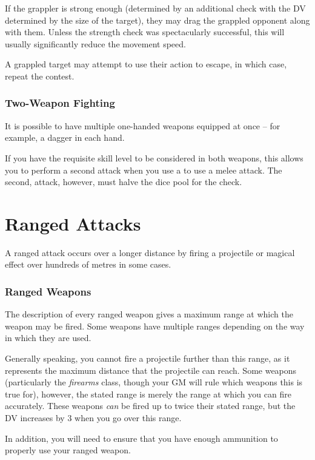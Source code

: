 If the grappler is strong enough (determined by an additional  check with the DV determined by the size of the target), they may drag the grappled opponent along with them. Unless the strength check was spectacularly successful, this will usually significantly reduce the movement speed. 

A grappled target may attempt to use their action to escape, in which case, repeat the contest. 

\subsubsection{Two-Weapon Fighting}

It is possible to have multiple one-handed weapons equipped at once -- for example, a dagger in each hand. 

If you have the requisite skill level to be considered  in both weapons, this allows you to perform a second attack when you use a  to use a melee attack. The second, attack, however, must halve the dice pool for the check.


\section{Ranged Attacks}

A ranged attack occurs over a longer distance by firing a projectile or magical effect over hundreds of metres in some cases. 

\subsubsection{Ranged Weapons}

The description of every ranged weapon gives a maximum range at which the weapon may be fired. Some weapons have multiple ranges depending on the way in which they are used. 

Generally speaking, you cannot fire a projectile further than this range, as it represents the maximum distance that the projectile can reach. Some weapons (particularly the {\it firearms} class, though your GM will rule which weapons this is true for), however, the stated range is merely the range at which you can fire accurately. These weapons {\it can} be fired up to twice their stated range, but the DV increases by 3 when you go over this range.

In addition, you will need to ensure that you have enough ammunition to properly use your ranged weapon.


